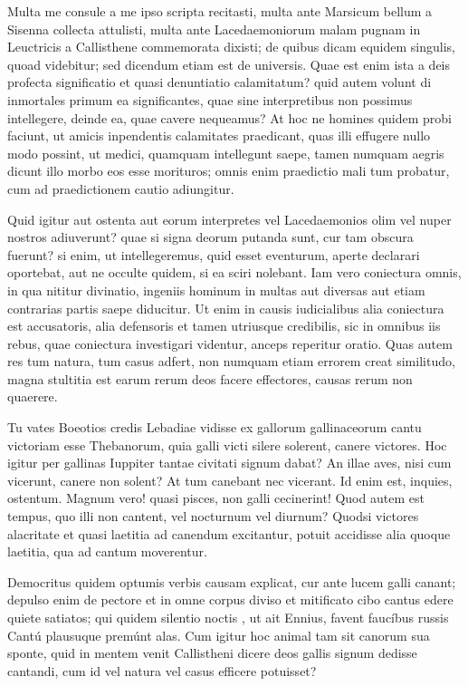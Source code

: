  Multa me consule a me ipso scripta recitasti, multa ante Marsicum bellum a Sisenna collecta attulisti, multa ante Lacedaemoniorum malam pugnam in Leuctricis a Callisthene commemorata dixisti; de quibus dicam equidem singulis, quoad videbitur; sed dicendum etiam est de universis. Quae est enim ista a deis profecta significatio et quasi denuntiatio calamitatum? quid autem volunt di inmortales primum ea significantes, quae sine interpretibus non possimus intellegere, deinde ea, quae cavere nequeamus? At hoc ne homines quidem probi faciunt, ut amicis inpendentis calamitates praedicant, quas illi effugere nullo modo possint, ut medici, quamquam intellegunt saepe, tamen numquam aegris dicunt illo morbo eos esse morituros; omnis enim praedictio mali tum probatur, cum ad praedictionem cautio adiungitur.

 Quid igitur aut ostenta aut eorum interpretes vel Lacedaemonios olim vel nuper nostros adiuverunt? quae si signa deorum putanda sunt, cur tam obscura fuerunt? si enim, ut intellegeremus, quid esset eventurum, aperte declarari oportebat, aut ne occulte quidem, si ea sciri nolebant. Iam vero coniectura omnis, in qua nititur divinatio, ingeniis hominum in multas aut diversas aut etiam contrarias partis saepe diducitur. Ut enim in causis iudicialibus alia coniectura est accusatoris, alia defensoris et tamen utriusque credibilis, sic in omnibus iis rebus, quae coniectura investigari videntur, anceps reperitur oratio. Quas autem res tum natura, tum casus adfert, non numquam etiam errorem creat similitudo, magna stultitia est earum rerum deos facere effectores, causas rerum non quaerere.

 Tu vates Boeotios credis Lebadiae vidisse ex gallorum gallinaceorum cantu victoriam esse Thebanorum, quia galli victi silere solerent, canere victores. Hoc igitur per gallinas Iuppiter tantae civitati signum dabat? An illae aves, nisi cum vicerunt, canere non solent? At tum canebant nec vicerant. Id enim est, inquies, ostentum. Magnum vero! quasi pisces, non galli cecinerint! Quod autem est tempus, quo illi non cantent, vel nocturnum vel diurnum? Quodsi victores alacritate et quasi laetitia ad canendum excitantur, potuit accidisse alia quoque laetitia, qua ad cantum moverentur.

 Democritus quidem optumis verbis causam explicat, cur ante lucem galli canant; depulso enim de pectore et in omne corpus diviso et mitificato cibo cantus edere quiete satiatos; qui quidem silentio noctis , ut ait Ennius, favent faucíbus russis Cantú plausuque premúnt alas. Cum igitur hoc animal tam sit canorum sua sponte, quid in mentem venit Callistheni dicere deos gallis signum dedisse cantandi, cum id vel natura vel casus efficere potuisset?

